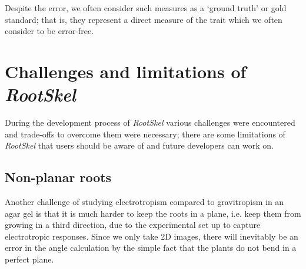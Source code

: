 Despite the error, we often consider such measures as a ‘ground truth’ or gold standard; that is, they represent a direct measure of the trait which we often consider to be error-free. 




\section{Challenges and limitations of \textit{RootSkel}}

During the development process of \textit{RootSkel} various challenges were encountered and trade-offs to overcome them were necessary; there are some limitations of \textit{RootSkel} that users should be aware of and future developers can work on.


\subsection{Non-planar roots}

Another challenge of studying electrotropism compared to gravitropism in an agar gel is that it is much harder to keep the roots in a plane, i.e. keep them from growing in a third direction, due to the experimental set up to capture electrotropic responses. Since we only take 2D images, there will inevitably be an error in the angle calculation by the simple fact that the plants do not bend in a perfect plane.

